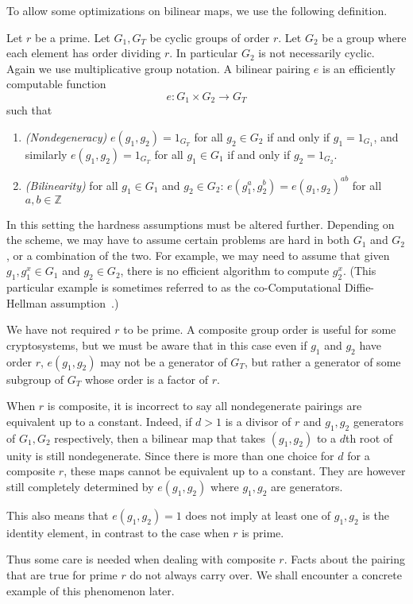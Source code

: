 To allow some optimizations on bilinear maps,
we use the following definition.

Let $r$ be a prime.
Let $G_1, G_T$ be cyclic groups of order $r$.
Let $G_2$ be a group where each element has order dividing $r$.
In particular $G_2$ is not necessarily cyclic.
Again we use multiplicative group notation.
A bilinear pairing $e$ is an efficiently computable function
\[
e:G_1 \times G_2 \rightarrow G_T
\]
such that
\begin{enumerate}
\item
\emph{(Nondegeneracy)}
$e(g_1,g_2) = 1_{G_T}$ for all $g_2 \in G_2$ if and only if $g_1 = 1_{G_1}$,
and similarly 
$e(g_1,g_2) = 1_{G_T}$ for all $g_1 \in G_1$ if and only if $g_2 = 1_{G_2}$.
\item
\emph{(Bilinearity)}
for all $g_1 \in G_1$ and $g_2 \in G_2$:
$e(g_1^a, g_2^b) = e(g_1,g_2)^{a b}$ for all $a, b \in \mathbb{Z}$
\end{enumerate}

In this setting the hardness assumptions must be altered further.
Depending on the scheme, we may have to assume certain problems are hard in
both $G_1$ and $G_2$, or a combination of the two. For example, we may
need to assume that given $g_1, g_1^x \in G_1$ and $g_2 \in G_2$,
there is no efficient algorithm to compute $g_2^x$. (This particular
example is sometimes referred to as
the co-Computational Diffie-Hellman assumption~\cite{bls}.)

We have not required $r$ to be prime. A composite group
order is useful for some cryptosystems\cite{bgn},
but we must be aware that in this case even if $g_1$ and $g_2$ have order
$r$, $e(g_1, g_2)$ may not be a generator of $G_T$, but rather a generator
of some subgroup of $G_T$ whose order is a factor of $r$.

When $r$ is composite, it is incorrect to say all nondegenerate pairings are
equivalent up to a constant. Indeed, if $d > 1$ is a divisor of $r$
and $g_1, g_2$ generators of $G_1, G_2$ respectively, then a bilinear map
that takes $(g_1, g_2)$ to a $d$th root of unity is still nondegenerate.
Since there is more than one choice for $d$ for a composite $r$,
these maps cannot be equivalent up to a constant. They are however still
completely determined by $e(g_1, g_2)$ where $g_1, g_2$ are generators.

This also means that $e(g_1, g_2) = 1$ does not imply at least
one of $g_1, g_2$ is the identity element, in contrast to the case when
$r$ is prime.

Thus some care is needed when dealing with composite $r$.
Facts about the pairing that are true for prime $r$ do not always carry over.
We shall encounter a concrete example of this phenomenon later.

